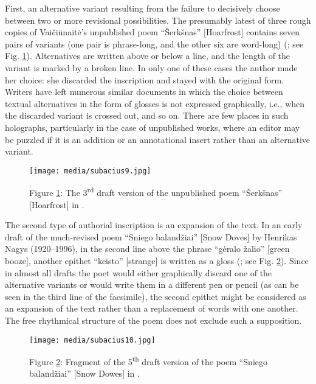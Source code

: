 \documentclass{article}
\begin{document}
First, an alternative variant resulting from the failure to decisively choose between two or more revisional possibilities. 
The presumably latest of three rough copies of Vaičiūnaitė's unpublished poem
``Šerkšnas'' {[}Hoarfrost{]} contains seven pairs of variants (one pair
is phrase-long, and the other six are word-long) (\citealt[11r]{vaiciunaite_serksnas_1967}; see Fig. \ref{fig:subacius9}). Alternatives are written above or below a line, and the
length of the variant is marked by a broken line. In only one of these
cases the author made her choice: she discarded the inscription and
stayed with the original form. Writers have left numerous similar
documents in which the choice between textual alternatives in the form
of glosses is not expressed graphically, i.e., when the discarded
variant is crossed out, and so on. There are few places in such
holographs, particularly in the case of unpublished works, where an
editor may be puzzled if it is an addition or an annotational insert
rather than an alternative variant.
\vfill
\begin{figure}[H]
    \centering
    \texttt{[image: media/subacius9.jpg]}
    \caption{Figure \ref{fig:subacius9}: The 3\textsuperscript{rd} draft version of the unpublished poem ``Šerkšnas'' {[}Hoarfrost{]} in \citealt[11r]{vaiciunaite_serksnas_1967}.}
    \label{fig:subacius9}
\end{figure}
\newpage

The second type of authorial inscription is an expansion of the text. In an early draft of the much-revised poem ``Sniego balandžiai'' {[}Snow Doves{]} by Henrikas Nagys (1920--1996), in the second line above the phrase ``gėralo žalio'' {[}green booze{]},
another epithet ``keisto'' {[}strange{]} is written as a gloss (\citealt[33v]{nagys_sniego_1951}; see Fig. \ref{fig:subacius10}). Since in almost all drafts the poet would
either graphically discard one of the alternative variants or would
write them in a different pen or pencil (as can be seen in the third
line of the facsimile), the second epithet might be considered as an
expansion of the text rather than a replacement of words with one
another. The free rhythmical structure of the poem does not exclude such
a supposition.

\begin{figure}[H]
    \centering
    \texttt{[image: media/subacius10.jpg]}
    \caption{Figure \ref{fig:subacius10}: Fragment of the 5\textsuperscript{th} draft version of the poem ``Sniego balandžiai'' {[}Snow Dowes{]} in \citealt[33v]{nagys_sniego_1951}.}
    \label{fig:subacius10}
\end{figure}
\end{document}
